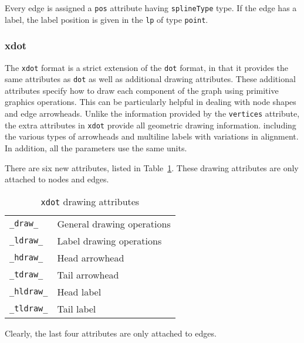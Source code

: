 Every edge is assigned a {\tt pos} attribute having {\tt splineType}
type. If the edge has a label, the label position is given in the
{\tt lp} of type {\tt point}. 

\subsubsection{xdot}

The {\tt xdot} format is a strict extension of the {\tt dot} format, in that it
provides the same attributes as {\tt dot} as well as additional drawing
attributes. These additional attributes specify how to draw each component of 
the graph using primitive graphics operations. This can be particularly
helpful in dealing with node shapes and edge arrowheads.
Unlike the information provided by the {\tt vertices} attribute, 
the extra attributes in {\tt xdot} provide all geometric drawing information.
including the various types of arrowheads and multiline labels with
variations in alignment. In addition, all the parameters use the same
units.

There are six new attributes, listed in Table~\ref{table:xdot}.
These drawing attributes are only attached to nodes and edges. 
\begin{table}[htb]
\centering
\begin{tabular}[t]{|ll|} \hline
{\tt \_draw\_} & General drawing operations \\
{\tt \_ldraw\_} & Label drawing operations \\
{\tt \_hdraw\_} & Head arrowhead \\
{\tt \_tdraw\_} & Tail arrowhead \\
{\tt \_hldraw\_} & Head label \\
{\tt \_tldraw\_} & Tail label \\
\hline
\end{tabular}
\caption{{\tt xdot} drawing attributes}
\label{table:xdot}
\end{table}
Clearly, the last four attributes are only attached to edges.

